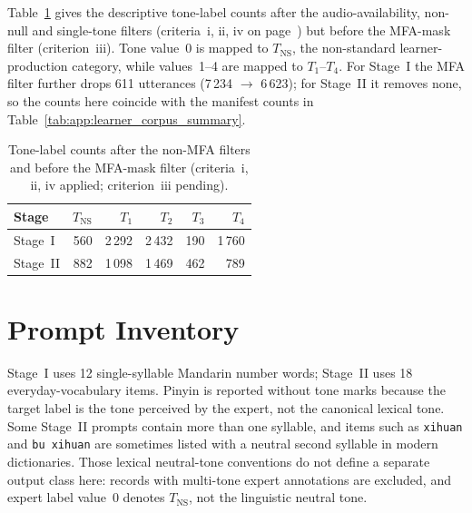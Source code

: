 Table~\ref{tab:app:csv_tone_counts} gives the descriptive tone-label counts
after the audio-availability, non-null and single-tone filters (criteria~i,
ii, iv on page~\pageref{sec:app:dataset_summary}) but before the MFA-mask
filter (criterion~iii). Tone value~0 is mapped to \(T_{\mathrm{NS}}\), the
non-standard learner-production category, while values~1--4 are mapped to
\(T_1\)--\(T_4\). For Stage~I the MFA filter further drops 611 utterances
(7\,234 $\to$ 6\,623); for Stage~II it removes none, so the counts here
coincide with the manifest counts in
Table~\ref{tab:app:learner_corpus_summary}.

\begin{table}[H]
\centering
\caption[Tone-label counts before the MFA-mask filter.]
{Tone-label counts after the non-MFA filters and before the
MFA-mask filter (criteria~i, ii, iv applied; criterion~iii pending).}
\label{tab:app:csv_tone_counts}
\small
\begin{tabular}{@{}lrrrrr@{}}
\toprule
\textbf{Stage} & \textbf{\(T_{\mathrm{NS}}\)} & \textbf{\(T_1\)} & \textbf{\(T_2\)} & \textbf{\(T_3\)} & \textbf{\(T_4\)} \\
\midrule
Stage~I & 560 & 2\,292 & 2\,432 & 190 & 1\,760 \\
Stage~II & 882 & 1\,098 & 1\,469 & 462 & 789 \\
\bottomrule
\end{tabular}
\end{table}

\section{Prompt Inventory}
\label{sec:app:prompt_inventory}

Stage~I uses 12 single-syllable Mandarin number words; Stage~II uses 18
everyday-vocabulary items. Pinyin is reported without tone marks because the
target label is the tone perceived by the expert, not the canonical lexical
tone. Some Stage~II prompts contain more than one syllable, and items such as
\texttt{xihuan} and \texttt{bu xihuan} are sometimes listed with a neutral
second syllable in modern dictionaries. Those lexical neutral-tone conventions do
not define a separate output class here: records with multi-tone expert
annotations are excluded, and expert label value~0 denotes
\(T_{\mathrm{NS}}\), not the linguistic neutral tone.

